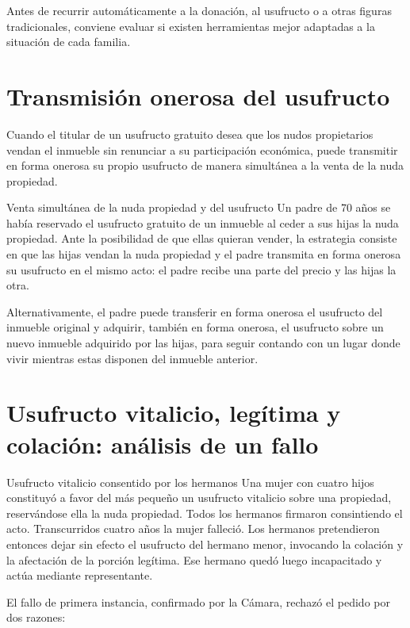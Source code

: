 \documentclass[12pt,oneside]{book}
\begin{document}
Antes de recurrir automáticamente a la donación, al usufructo o a otras figuras tradicionales, conviene evaluar si existen herramientas mejor adaptadas a la situación de cada familia.

\section{Transmisión onerosa del usufructo}

Cuando el titular de un usufructo gratuito desea que los nudos propietarios vendan el inmueble sin renunciar a su participación económica, puede transmitir en forma onerosa su propio usufructo de manera simultánea a la venta de la nuda propiedad.

\begin{example}{Venta simultánea de la nuda propiedad y del usufructo}
Un padre de 70 años se había reservado el usufructo gratuito de un inmueble al ceder a sus hijas la nuda propiedad. Ante la posibilidad de que ellas quieran vender, la estrategia consiste en que las hijas vendan la nuda propiedad y el padre transmita en forma onerosa su usufructo en el mismo acto: el padre recibe una parte del precio y las hijas la otra.

Alternativamente, el padre puede transferir en forma onerosa el usufructo del inmueble original y adquirir, también en forma onerosa, el usufructo sobre un nuevo inmueble adquirido por las hijas, para seguir contando con un lugar donde vivir mientras estas disponen del inmueble anterior.
\end{example}

\section{Usufructo vitalicio, legítima y colación: análisis de un fallo}
\label{sec:legitima}

\begin{example}{Usufructo vitalicio consentido por los hermanos}
Una mujer con cuatro hijos constituyó a favor del más pequeño un usufructo vitalicio sobre una propiedad, reservándose ella la nuda propiedad. Todos los hermanos firmaron consintiendo el acto. Transcurridos cuatro años la mujer falleció. Los hermanos pretendieron entonces dejar sin efecto el usufructo del hermano menor, invocando la colación y la afectación de la porción legítima. Ese hermano quedó luego incapacitado y actúa mediante representante.
\end{example}

El fallo de primera instancia, confirmado por la Cámara, rechazó el pedido por dos razones:
\end{document}
